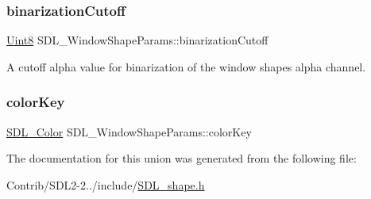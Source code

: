 \subsubsection{\texorpdfstring{binarization\+Cutoff}{binarizationCutoff}}
{\footnotesize\ttfamily \mbox{\hyperlink{_s_d_l__stdinc_8h_a2944638813a090aa23e62f4da842c3e2}{Uint8}} S\+D\+L\+\_\+\+Window\+Shape\+Params\+::binarization\+Cutoff}



A cutoff alpha value for binarization of the window shape\textquotesingle{}s alpha channel. 

\mbox{\label{union_s_d_l___window_shape_params_a8bf3e442a51a1bbf452cfec7c1ed5318}} 
\subsubsection{\texorpdfstring{color\+Key}{colorKey}}
{\footnotesize\ttfamily \mbox{\hyperlink{struct_s_d_l___color}{S\+D\+L\+\_\+\+Color}} S\+D\+L\+\_\+\+Window\+Shape\+Params\+::color\+Key}



The documentation for this union was generated from the following file\+:\begin{DoxyCompactItemize}
\item 
Contrib/\+S\+D\+L2-\/2../include/\mbox{\hyperlink{_s_d_l__shape_8h}{S\+D\+L\+\_\+shape.\+h}}\end{DoxyCompactItemize}
